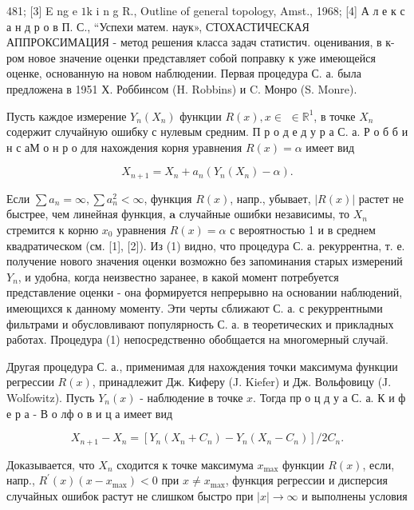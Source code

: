 \documentclass[10pt]{article}
\begin{document}
481; [3] E ng e $1 \mathrm{k}$ i n g R., Outline of general topology, Amst., 1968; [4] А л е к с а н д р о в П. С., “Успехи матем. наук», СТОХАСТИЧЕСКАЯ АППРОКСИМАЦИЯ - метод решения класса задач статистич. оценивания, в к-ром новое значение оценки представляет собой поправку к уже имеющейся оценке, основанную на новом наблюдении. Первая процедура С. а. была предложена в 1951 Х. Роббинсом (H. Robbins) и C. Монро (S. Monre).



Пусть каждое измерение $Y_{n}\left(X_{n}\right)$ функции $R(x), x \in$ $\in \mathbb{R}^{1}$, в точке $X_{n}$ содержит случайную ошибку с нулевым средним. П р о д е д у р а С. а. Р о б б и н с аМ о н р о для нахождения корня уравнения $R(x)=\alpha$ имеет вид



\[

X_{n+1}=X_{n}+a_{n}\left(Y_{n}\left(X_{n}\right)-\alpha\right) .

\]



Если $\sum a_{n}=\infty, \sum a_{n}^{2}<\infty$, функция $R(x)$, напр., убывает, $|R(x)|$ растет не быстрее, чем линейная функция, $\mathbf{a}$ случайные ошибки независимы, то $X_{n}$ стремится к корню $x_{0}$ уравнения $R(x)=\alpha$ с вероятностью 1 и в среднем квадратическом (см. [1], [2]). Из (1) видно, что процедура С. а. рекуррентна, т. е. получение нового значения оценки возможно без запоминания старых измерений $Y_{n}$, и удобна, когда неизвестно заранее, в какой момент потребуется представление оценки - она формируется непрерывно на основании наблюдений, имеющихся к данному моменту. Эти черты сближают С. а. с рекуррентными фильтрами и обусловливают популярность С. а. в теоретических и прикладных работах. Процедура (1) непосредственно обобщается на многомерный случай.



Другая процедура С. а., применимая для нахождения точки максимума функции регрессии $R(x)$, принадлежит Дж. Киферу (J. Kiefer) и Дж. Вольфовицу (J. Wolfowitz). Пусть $Y_{n}(x)$ - наблюдение в точке $x$. Тогда пр о ц д у а С. а. К и ф е р а - В о лф о в и ц а имеет вид



\[

X_{n+1}-X_{n}=\left[Y_{n}\left(X_{n}+C_{n}\right)-Y_{n}\left(X_{n}-C_{n}\right)\right] / 2 C_{n} .

\]



Доказывается, что $X_{n}$ сходится к точке максимума $x_{\max }$ функции $R(x)$, если, напр., $R^{\prime}(x)\left(x-x_{\max }\right)<0$ при $x \neq x_{\max }$, функция регрессии и дисперсия случайных ошибок растут не слишком быстро при $|x| \rightarrow \infty$ и выполнены условия
\end{document}
